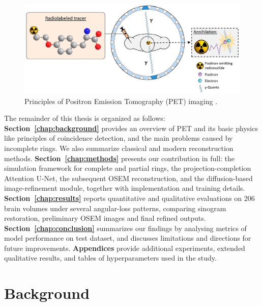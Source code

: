 \documentclass[12pt]{iopart}
\begin{document}
\begin{figure}[htbp]
	\centering
	\includegraphics[scale=0.70]{./Images/graph.jpg}
	\caption{Principles of Positron Emission Tomography (PET) imaging \cite{Neumaier}.}
	\label{fig:graph}
\end{figure}

The remainder of this thesis is organized as follows:
\textbf{Section~\ref{chap:background}} provides an overview of PET and its basic physics like principles of coincidence detection, and the main problems caused by incomplete rings. We also summarize classical and modern reconstruction methods.
\textbf{Section~\ref{chap:methods}} presents our contribution in full: the simulation framework for complete and partial rings, the projection-completion Attention U-Net, the subsequent OSEM reconstruction, and the diffusion-based image-refinement module, together with implementation and training details.
\textbf{Section~\ref{chap:results}} reports quantitative and qualitative evaluations on 206 brain volumes under several angular-loss patterns, comparing sinogram restoration, preliminary OSEM images and final refined outputs.
\textbf{Section~\ref{chap:conclusion}} summarizes our findings by analysing metrics of model performance on test dataset, and discusses limitations and directions for future improvements.
\textbf{Appendices} provide additional experiments, extended qualitative results, and tables of hyperparameters used in the study.




\section{Background}
\end{document}
